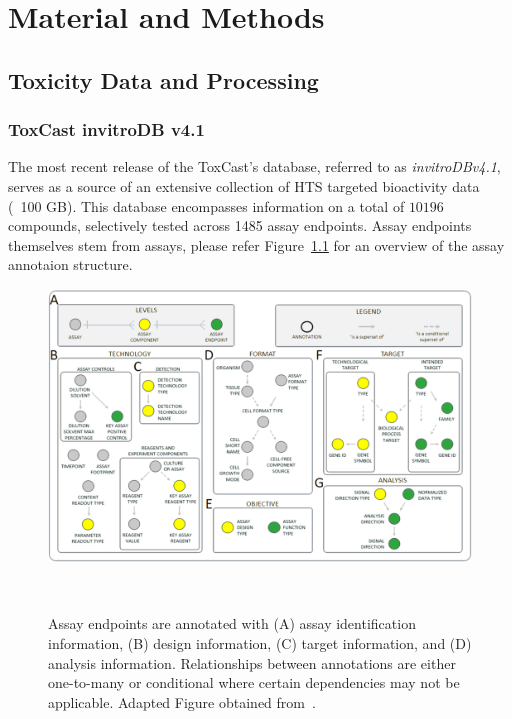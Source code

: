 \chapter{Material and Methods}\label{chap:material_and_methods}

\section{Toxicity Data and Processing}\label{sec:invitrodb}
\subsection{ToxCast invitroDB v4.1}
The most recent release of the ToxCast's database, referred to as \emph{invitroDBv4.1}, serves as a source of an extensive collection of HTS targeted bioactivity data (~100 GB). This database encompasses information on a total of $\num{10196}$ compounds, selectively tested across 1485 assay endpoints.
Assay endpoints themselves stem from assays, please refer Figure~\ref{fig:toxcast_db_annotations_recolored} for an overview of the assay annotaion structure.

\begin{figure}  %
    \centering
    \includegraphics[width=1.0\textwidth]{figures/toxcast_db_annotations_recolored.png}  
    \caption{Assay endpoints are annotated with (A) assay
    identification information, (B) design information, (C) target information, and (D) analysis information. Relationships between annotations are either one-to-many or conditional where certain dependencies may not be applicable. Adapted Figure obtained from~\cite{userguide}.}
~\label{fig:toxcast_db_annotations_recolored} 
\end{figure}

